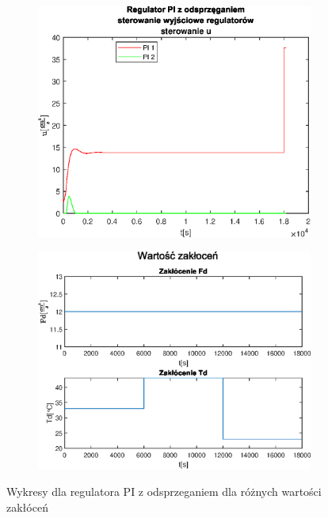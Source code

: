 \begin{figure}[h!]
   \begin{subfigure}[b]{0.4\textwidth}
      \includegraphics[width=1\linewidth]{img/PI/decoupler/disturbance/PIDecouplerControlD2.eps}
      \caption{}
      \label{fig:fig:PIDecoupler23}
   \end{subfigure}
       
   \begin{subfigure}[b]{0.4\textwidth}
      \includegraphics[width=1\linewidth]{img/PI/decoupler/disturbance/PIDecouplerDisturbance2.eps}
      \caption{}
      \label{fig:fig:PIDecoupler24}
   \end{subfigure}
       
   \caption{Wykresy dla regulatora PI z odsprzeganiem dla różnych wartości zakłóceń}
   \label{fig:PIDecoupler2}
\end{figure}
           
